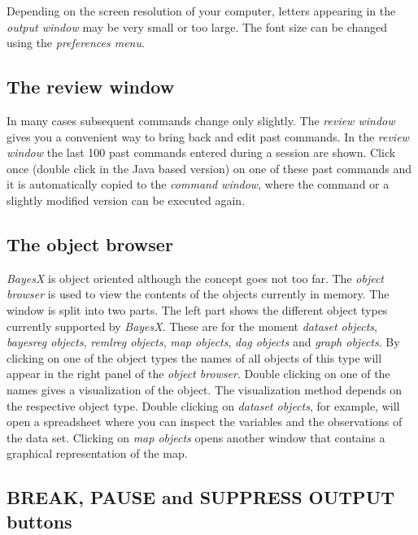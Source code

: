 Depending on the screen resolution of your computer, letters
appearing in the {\em output window} may be very small or too large. The
font size can be changed  using the {\em preferences menu}.



\subsection{The review window}
 

In many cases subsequent commands change only slightly. The {\em
review window} gives you a convenient way to bring back and edit
past commands. In the {\em review window} the last 100 past
commands entered during a session are shown. Click once (double
click in the Java based version) on one of these past commands and
it is automatically copied to the {\em command window}, where the
command or a slightly modified version can be executed again.

\subsection{The object browser}

{\em BayesX} is object oriented although the concept goes not too
far. The {\em object browser} is used to view the contents of the
objects currently in memory. The window is split into two parts.
The left part shows the different object types currently supported
by {\em BayesX}. These are for the moment {\em dataset objects},
{\em bayesreg objects}, {\em remlreg objects}, {\em map objects},
{\em dag objects} and {\em graph objects}. By clicking on one of
the object types the names of all objects of this type will appear
in the right panel of the {\em object browser}. Double clicking on one
of the names gives a visualization of the object. The
visualization method depends on the respective object type. Double
clicking on {\em dataset objects}, for example, will open a
spreadsheet where you can inspect the variables and the
observations of the data set. Clicking on {\em map objects} opens
another window that contains a graphical representation of the
map.

\subsection{BREAK, PAUSE and SUPPRESS OUTPUT buttons}
    
 

